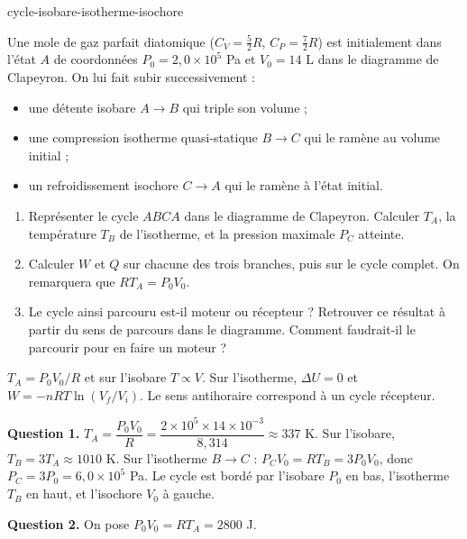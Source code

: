 \begin{exo}{cycle-isobare-isotherme-isochore}

Une mole de gaz parfait diatomique ($C_V = \frac{5}{2}R$, $C_P = \frac{7}{2}R$) est initialement dans l'état $A$ de coordonnées $P_0 = 2{,}0\times10^5$ Pa et $V_0 = 14$ L dans le diagramme de Clapeyron. On lui fait subir successivement :
\begin{itemize}
\item une détente isobare $A\to B$ qui triple son volume ;
\item une compression isotherme quasi-statique $B\to C$ qui le ramène au volume initial ;
\item un refroidissement isochore $C\to A$ qui le ramène à l'état initial.
\end{itemize}

\begin{enumerate}
\item Représenter le cycle $ABCA$ dans le diagramme de Clapeyron. Calculer $T_A$, la température $T_B$ de l'isotherme, et la pression maximale $P_C$ atteinte.
\item Calculer $W$ et $Q$ sur chacune des trois branches, puis sur le cycle complet. On remarquera que $RT_A = P_0V_0$.
\item Le cycle ainsi parcouru est-il moteur ou récepteur ? Retrouver ce résultat à partir du sens de parcours dans le diagramme. Comment faudrait-il le parcourir pour en faire un moteur ?
\end{enumerate}

\begin{indication}
$T_A = P_0V_0/R$ et sur l'isobare $T \propto V$. Sur l'isotherme, $\Delta U = 0$ et $W = -nRT\ln(V_f/V_i)$. Le sens antihoraire correspond à un cycle récepteur.
\end{indication}

\begin{solution}
\textbf{Question 1.} $T_A = \dfrac{P_0V_0}{R} = \dfrac{2\times10^5 \times 14\times10^{-3}}{8{,}314} \approx 337$ K. Sur l'isobare, $T_B = 3T_A \approx 1010$ K. Sur l'isotherme $B\to C$ : $P_CV_0 = RT_B = 3P_0V_0$, donc $P_C = 3P_0 = 6{,}0\times10^5$ Pa. Le cycle est bordé par l'isobare $P_0$ en bas, l'isotherme $T_B$ en haut, et l'isochore $V_0$ à gauche.

\textbf{Question 2.} On pose $P_0V_0 = RT_A = 2800$ J.


\end{solution}
\end{exo}
